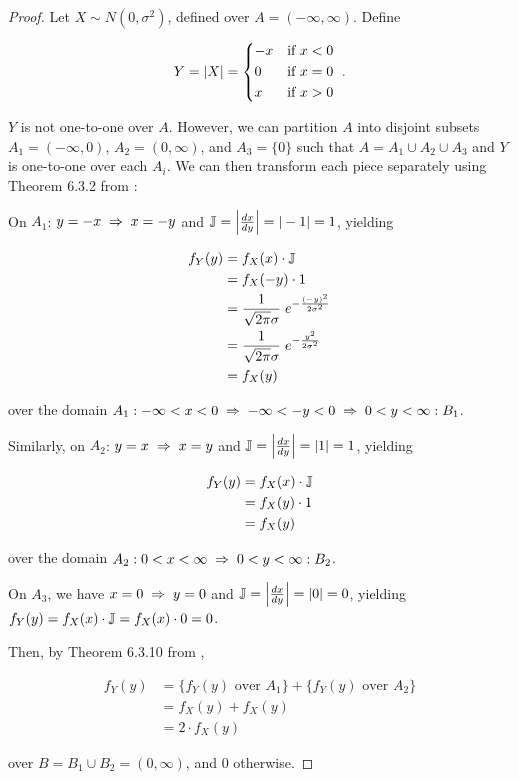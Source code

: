 \documentclass{article}
\begin{document}
\begin{proof}
  Let $X \sim N(0, \sigma^2)$, defined over $A = (-\infty, \infty)$. Define 
  
  \begin{equation*}
    Y = |X| =
    \begin{dcases*}
      -x & if $x < 0$ \\
      0 & if $x = 0$ \\
      x & if $x > 0$ \\
    \end{dcases*}
    .
  \end{equation*}

  $Y$ is not one-to-one over $A$. However, we can partition $A$ into disjoint
  subsets $A_1 = (-\infty, 0)$, $A_2 = (0, \infty)$, and $A_3 = \{0\}$ such
  that $A = A_1 \cup A_2 \cup A_3$ and $Y$ is one-to-one over each $A_i$. We
  can then transform each piece separately using Theorem 6.3.2 from
  \citet{textbook}:

  On $A_1$: $y = -x \;\Rightarrow\; x = -y$ and $\mathbb{J} = \left| \frac{dx}{dy} \right| = |-1|
  = 1$, yielding

  \begin{align*}
    f_Y(y) &= f_X(x) \cdot \mathbb{J} \\
    &= f_X(-y) \cdot 1 \\
    &= \frac{1}{\sqrt{2\pi}\sigma} \; e^{-\frac{(-y)^2}{2\sigma^2}} \\
    &= \frac{1}{\sqrt{2\pi}\sigma} \; e^{-\frac{y^2}{2\sigma^2}} \\
    &= f_X(y)
  \end{align*}

  over the domain $A_1: -\infty < x < 0 \;\Rightarrow\; -\infty < -y < 0 \;\Rightarrow\; 0 < y < \infty :B_1$.

  Similarly, on $A_2$: $y = x \;\Rightarrow\; x = y$ and $\mathbb{J} = \left| \frac{dx}{dy}
  \right| = |1| = 1$, yielding

  \begin{align*}
    f_Y(y) &= f_X(x) \cdot \mathbb{J} \\
    &= f_X(y) \cdot 1 \\
    &= f_X(y)
  \end{align*}

  over the domain $A_2: 0 < x < \infty \;\Rightarrow\; 0 < y < \infty :B_2$.

  On $A_3$, we have $x = 0 \;\Rightarrow\; y = 0$ and $\mathbb{J} = \left| \frac{dx}{dy} \right| =
  |0| = 0$, yielding $f_Y(y) = f_X(x) \cdot \mathbb{J} = f_X(x) \cdot 0 = 0$.

  Then, by Theorem 6.3.10 from \citet{textbook},

  \begin{align*}
    f_Y(y) &= \{ f_Y(y) \textrm{ over } A_1 \} + \{ f_Y(y) \textrm{ over } A_2 \} \\
    &= f_X(y) + f_X(y) \\
    &= 2 \cdot f_X(y)
  \end{align*}

  over $B = B_1 \cup B_2 = (0, \infty)$, and 0 otherwise.
\end{proof}
\end{document}
